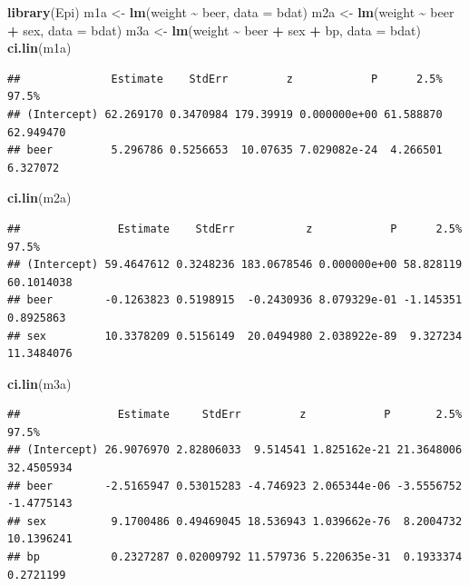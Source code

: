 \documentclass[
]{book}
\newenvironment{Shaded}{\begin{snugshade}}{\end{snugshade}}
\newcommand{\AttributeTok}[1]{\textcolor[rgb]{0.13,0.29,0.53}{#1}}
\newcommand{\FunctionTok}[1]{\textcolor[rgb]{0.13,0.29,0.53}{\textbf{#1}}}
\newcommand{\NormalTok}[1]{#1}
\newcommand{\OtherTok}[1]{\textcolor[rgb]{0.56,0.35,0.01}{#1}}
\newcommand{\SpecialCharTok}[1]{\textcolor[rgb]{0.81,0.36,0.00}{\textbf{#1}}}
\theoremstyle{definition}
\theoremstyle{definition}
\theoremstyle{definition}
\theoremstyle{definition}
\theoremstyle{remark}
\begin{document}
\begin{Shaded}
\begin{Highlighting}[]
\FunctionTok{library}\NormalTok{(Epi)}
\NormalTok{m1a }\OtherTok{\textless{}{-}} \FunctionTok{lm}\NormalTok{(weight }\SpecialCharTok{\textasciitilde{}}\NormalTok{ beer, }\AttributeTok{data =}\NormalTok{ bdat)}
\NormalTok{m2a }\OtherTok{\textless{}{-}} \FunctionTok{lm}\NormalTok{(weight }\SpecialCharTok{\textasciitilde{}}\NormalTok{ beer }\SpecialCharTok{+}\NormalTok{ sex, }\AttributeTok{data =}\NormalTok{ bdat)}
\NormalTok{m3a }\OtherTok{\textless{}{-}} \FunctionTok{lm}\NormalTok{(weight }\SpecialCharTok{\textasciitilde{}}\NormalTok{ beer }\SpecialCharTok{+}\NormalTok{ sex }\SpecialCharTok{+}\NormalTok{ bp, }\AttributeTok{data =}\NormalTok{ bdat)}
\FunctionTok{ci.lin}\NormalTok{(m1a)}
\end{Highlighting}
\end{Shaded}

\begin{verbatim}
##              Estimate    StdErr         z            P      2.5%     97.5%
## (Intercept) 62.269170 0.3470984 179.39919 0.000000e+00 61.588870 62.949470
## beer         5.296786 0.5256653  10.07635 7.029082e-24  4.266501  6.327072
\end{verbatim}

\begin{Shaded}
\begin{Highlighting}[]
\FunctionTok{ci.lin}\NormalTok{(m2a)}
\end{Highlighting}
\end{Shaded}

\begin{verbatim}
##               Estimate    StdErr           z            P      2.5%      97.5%
## (Intercept) 59.4647612 0.3248236 183.0678546 0.000000e+00 58.828119 60.1014038
## beer        -0.1263823 0.5198915  -0.2430936 8.079329e-01 -1.145351  0.8925863
## sex         10.3378209 0.5156149  20.0494980 2.038922e-89  9.327234 11.3484076
\end{verbatim}

\begin{Shaded}
\begin{Highlighting}[]
\FunctionTok{ci.lin}\NormalTok{(m3a)}
\end{Highlighting}
\end{Shaded}

\begin{verbatim}
##               Estimate     StdErr         z            P       2.5%      97.5%
## (Intercept) 26.9076970 2.82806033  9.514541 1.825162e-21 21.3648006 32.4505934
## beer        -2.5165947 0.53015283 -4.746923 2.065344e-06 -3.5556752 -1.4775143
## sex          9.1700486 0.49469045 18.536943 1.039662e-76  8.2004732 10.1396241
## bp           0.2327287 0.02009792 11.579736 5.220635e-31  0.1933374  0.2721199
\end{verbatim}
\end{document}
